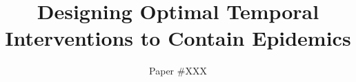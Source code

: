 \documentclass[sigconf]{aamas}  %
\begin{document}
\title{Designing Optimal Temporal Interventions to Contain Epidemics}  %


\author{Paper \#XXX}  %

%
%
%
%
%
%
%
%
\end{document}
